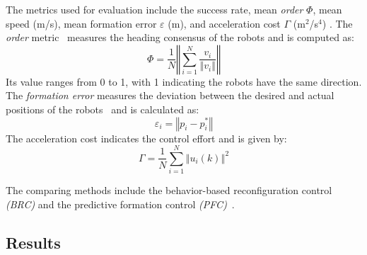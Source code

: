 The metrics used for evaluation include the success rate, mean \textit{order} $\Phi$, mean speed (m/s), mean formation error $\varepsilon$ (m), and acceleration cost $\Gamma$ (m$^2$/s$^4$) \cite{Zhang2021}. The \textit{order} metric~\cite{Vicsek1995} measures the heading consensus of the robots and is computed as:
\begin{equation}
    \Phi=\dfrac{1}{N}\left\Vert\sum_{i=1}^N{\dfrac{v_i}{\left\Vert v_i\right\Vert}}\right\Vert
\end{equation}
Its value ranges from 0 to 1, with 1 indicating the robots have the same direction. The \textit{formation error} measures the deviation between the desired and actual positions of the robots~\cite{6798711} and is calculated as:
\begin{equation}
    \varepsilon_i = \left\Vert p_i-p^*_i\right\Vert
\end{equation} 
The acceleration cost indicates the control effort and is given by:
\begin{equation}
    \Gamma = \dfrac{1}{N}\sum_{i=1}^N{\left\Vert u_i(k)\right\Vert^2}
\end{equation} 

The comparing methods include the behavior-based reconfiguration control \textit{(BRC)} \cite{736776,Vsrhelyi2018} and the predictive formation control \textit{(PFC)}~\cite{Soria2021,9562281}. 

\subsection{Results}
\label{subsec:results}

